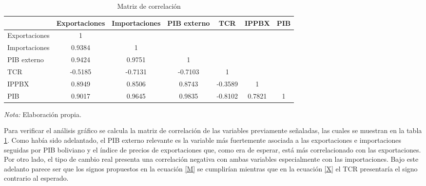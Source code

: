 \documentclass[12pt,letterpaper]{article}
\begin{document}
\begin{table}
\caption{Matriz de correlación}
\begin{center}
\begin{tabular}{lcccccc}									
\hline													
\hline												
	&	Exportaciones	&	Importaciones	&	PIB externo	&	TCR	&	IPPBX	&	PIB	\\
\hline													
Exportaciones	&	1	&		&		&		&		&		\\
Importaciones	&	0.9384	&	1	&		&		&		&		\\
PIB externo	&	0.9424	&	0.9751	&	1	&		&		&		\\
TCR	&	-0.5185	&	-0.7131	&	-0.7103	&	1	&		&		\\
IPPBX	&	0.8949	&	0.8506	&	0.8743	&	-0.3589	&	1	&		\\
PIB	&	0.9017	&	0.9645	&	0.9835	&	-0.8102	&	0.7821	&	1	\\
\hline													
\hline									
\end{tabular}	
\end{center}						
\begin{scriptsize}
\emph{Nota:} Elaboración propia.
\end{scriptsize}	
\label{corre}	
\end{table}	

Para verificar el análisis gráfico se calcula la matriz de correlación de las variables previamente señaladas, las cuales se muestran en la tabla \ref{corre}. Como había sido adelantado, el PIB externo relevante es la variable más fuertemente asociada a las exportaciones e importaciones seguidas por PIB boliviano y el índice de precios de exportaciones que, como era de esperar, está más correlacionado con las exportaciones. Por otro lado, el tipo de cambio real presenta una correlación negativa con ambas variables especialmente con las importaciones. Bajo este adelanto parece ser que los signos propuestos en la ecuación \ref{M} se cumplirían mientras que en la ecuación \ref{X} el TCR presentaría el signo contrario al esperado.
\end{document}
